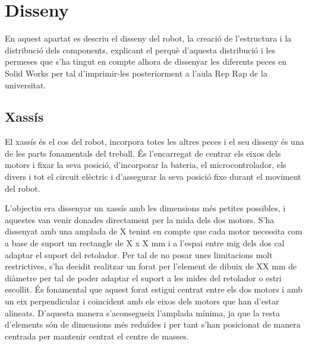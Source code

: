 \setlength\topmargin{8mm}
\onehalfspacing
\chapter{Disseny} %

\label{Chapter3} %


En aquest apartat es descriu el disseny del robot, la creació de l’estructura i la distribució dels components, explicant el perquè d’aquesta distribució i les permeses que s’ha tingut en compte alhora de dissenyar les diferents peces en Solid Works per tal d'imprimir-les posteriorment a l'aula Rep Rap de la universitat.   

\section{Xassís}

El xassís és el cos del robot, incorpora totes les altres peces i el seu disseny és una de les parts fonamentals del treball. És l’encarregat de centrar els eixos dels motors i fixar la seva posició, d’incorporar la bateria, el microcontrolador, els divers i tot el circuit elèctric i d'assegurar la seva posició fixe durant el moviment del robot. 
 
L’objectiu era dissenyar un xassís amb les dimensions més petites possibles, i aquestes van venir donades directament per la mida dels dos motors. S’ha dissenyat  amb una amplada de X tenint en compte que cada motor necessita com a base de suport un rectangle de X x X mm i a l’espai entre mig dels dos cal adaptar el suport del retolador. Per tal de no posar unes limitacions molt restrictives, s’ha decidit realitzar un forat per l’element de dibuix de XX mm de diàmetre per tal de poder adaptar el suport a les mides del retolador o estri escollit. És fonamental que aquest forat estigui centrat entre els dos motors i amb un eix perpendicular i coincident amb els eixos dels motors que han d’estar alineats. D’aquesta manera s’aconsegueix l’amplada mínima, ja que la resta d’elements són de dimensions més reduïdes i per tant s’han posicionat de manera centrada per mantenir centrat el centre de masses. 

